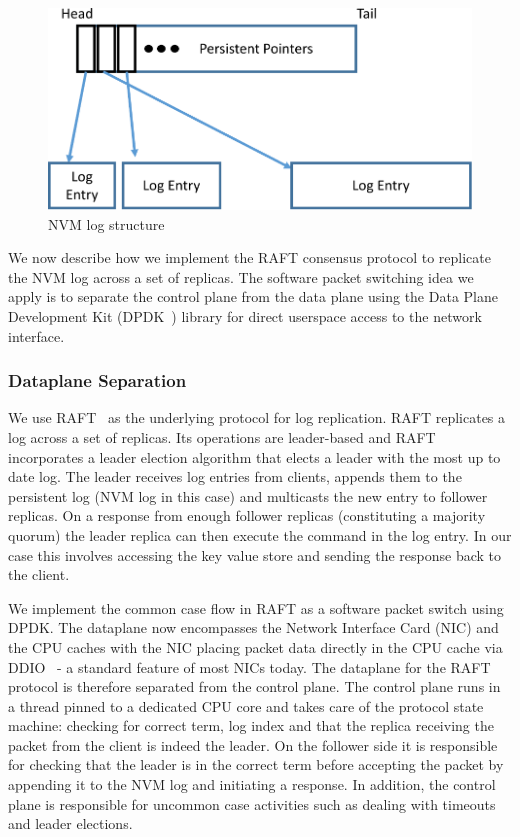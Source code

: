\documentclass[10pt, preprint, nonatbib]{sigplanconf}
\begin{document}
\begin{figure}
\centering
\includegraphics[scale=0.3]{figures2/nvm_log.pdf}
\caption{NVM log structure}
\label{fig:nvm_log}
\end{figure}

We now describe how we implement the RAFT consensus protocol to replicate the
NVM log across a set of replicas. The software packet switching idea we apply is
to separate the control plane from the data plane using the Data Plane
Development Kit (DPDK~\cite{dpdk}) library for direct userspace access to the
network interface.

\subsubsection{Dataplane Separation}
We use RAFT~\cite{raft} as the underlying protocol for log replication. RAFT
replicates a log across a set of replicas. Its operations are leader-based and
RAFT incorporates a leader election algorithm that elects a leader with the most
up to date log. The leader receives log entries from clients, appends them to the
persistent log (NVM log in this case) and multicasts the new entry to follower
replicas. On a response from enough follower replicas (constituting a majority
quorum) the leader replica can then execute the command in the log entry. In
our case this involves accessing the key value store and sending the response
back to the client.

We implement the common case flow in RAFT as a software packet switch using
DPDK. The dataplane now encompasses the Network Interface Card (NIC) and the CPU
caches with the NIC placing packet data directly in the CPU cache via
DDIO~\cite{ddio} - a standard feature of most NICs today. The dataplane for the
RAFT protocol is therefore separated from the control plane. The control plane
runs in a thread pinned to a dedicated CPU core and takes care of the protocol
state machine: checking for correct term, log index and that the replica
receiving the packet from the client is indeed the leader. On the follower side
it is responsible for checking that the leader is in the correct term before
accepting the packet by appending it to the NVM log and initiating a
response. In addition, the control plane is responsible for uncommon case
activities such as dealing with timeouts and leader elections.
\end{document}
